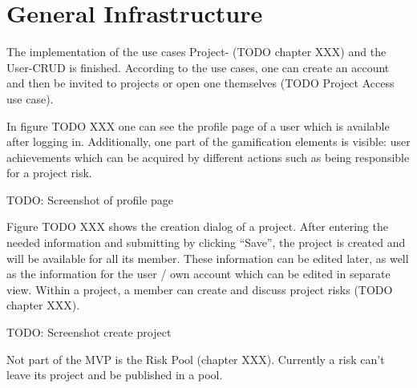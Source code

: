 \section{General Infrastructure}
\label{sec:implementationInfra}

The implementation of the use cases Project- (TODO chapter XXX) and the User-CRUD is finished. According to the use cases, one can create an account and then be invited to projects or open one themselves (TODO Project Access use case). 

In figure TODO XXX one can see the profile page of a user which is available after logging in. Additionally, one part of the gamification elements is visible: user achievements which can be acquired by different actions such as being responsible for a project risk.

TODO: Screenshot of profile page

Figure TODO XXX shows the creation dialog of a project. After entering the needed information and submitting by clicking “Save”, the project is created and will be available for all its member. These information can be edited later, as well as the information for the user / own account which can be edited in separate view. Within a project, a member can create and discuss project risks (TODO chapter XXX).

TODO: Screenshot create project

Not part of the MVP is the Risk Pool (chapter XXX). Currently a risk can’t leave its project and be published in a pool.


